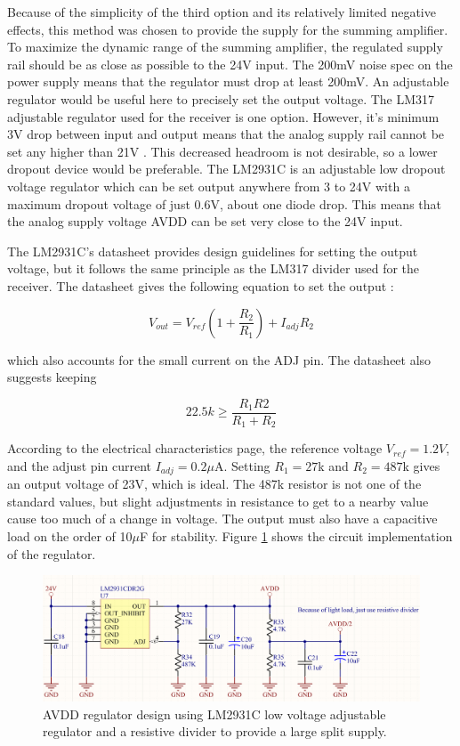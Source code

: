 \documentclass{article}
\begin{document}
	Because of the simplicity of the third option and its relatively limited negative effects, this method was chosen to provide the supply for the summing amplifier.  To maximize the dynamic range of the summing amplifier, the regulated supply rail should be as close as possible to the 24V input.  The 200mV noise spec on the power supply means that the regulator must drop at least 200mV.  An adjustable regulator would be useful here to precisely set the output voltage.  The LM317 adjustable regulator used for the receiver is one option.  However, it's minimum 3V drop between input and output means that the analog supply rail cannot be set any higher than 21V \cite{LM317datasheet}.  This decreased headroom is not desirable, so a lower dropout device would be preferable.  The LM2931C is an adjustable low dropout voltage regulator which can be set output anywhere from 3 to 24V with a maximum dropout voltage of just 0.6V, about one diode drop.  This means that the analog supply voltage AVDD can be set very close to the 24V input.

	The LM2931C's datasheet provides design guidelines for setting the output voltage, but it follows the same principle as the LM317 divider used for the receiver.  The datasheet gives the following equation to set the output \cite{LM2931datasheet}:

	$$ V_{out} = V_{ref} \left( 1 + \frac{R_2}{R_1} \right) + I_{adj}R_2 $$

	which also accounts for the small current on the ADJ pin.  The datasheet also suggests keeping

	$$ 22.5k \ge \frac{R_1R2}{R_1 + R_2} $$

	According to the electrical characteristics page, the reference voltage $V_{ref} = 1.2V$, and the adjust pin current $I_{adj} = 0.2\mu$A.  Setting $R_1 = 27$k and $R_2 = 487$k gives an output voltage of 23V, which is ideal.  The 487k resistor is not one of the standard values, but slight adjustments in resistance to get to a nearby value cause too much of a change in voltage.  The output must also have a capacitive load on the order of 10$\mu$F for stability.  Figure \ref{fig:AVDDreg} shows the circuit implementation of the regulator.

	\begin{figure}
		\centering
		\includegraphics[width = \textwidth]{PR4Images/AVDDregulator.PNG}
		\caption{AVDD regulator design using LM2931C low voltage adjustable regulator and a resistive divider to provide a large split supply.}
		\label{fig:AVDDreg}
	\end{figure}
\end{document}
